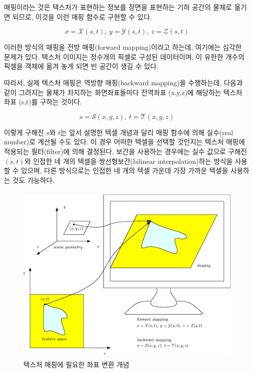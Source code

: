 매핑이라는 것은 텍스처가 표현하는 정보를 장면을 표현하는 기하 공간의 물체로 옮기면 되므로, 이것을 이런 매핑 함수로 구현할 수 있다.

$$x = {\mathcal X}(s,t), ~ y = {\mathcal Y}(s,t), ~ z={\mathcal Z}(s,t)$$


이러한 방식의 매핑을 전방 매핑(forward mapping)이라고 하는데, 여기에는 심각한 문제가 있다. 텍스처 이미지는 정수개의 픽셀로 구성된 데이터이며, 이 유한한 개수의 픽셀을 객체에 옮겨 놓게 되면 빈 공간이 생길 수 있다.

따라서, 실제 텍스처 매핑은 역방향 매핑(backward mapping)을 수행하는데, 다음과 같이 그려지는 물체가 차지하는 화면좌표들마다 전역좌표 (x,y,z)에 해당하는 텍스처 좌표 (s,t)를 구하는 것이다.

$$s = {\mathcal S}(x,y,z), ~ t = {\mathcal T}(x,y,z)$$

이렇게 구해진 $s$와 $t$는 앞서 설명한 텍셀 개념과 달리 매핑 함수에 의해 실수(real number)로 계산될 수도 있다. 
이 경우 어떠한 텍셀을 선택할 것인지는 텍스처 매핑에 적용되는 필터(filter)에 의해 결정된다.
보간을 사용하는 경우에는 실수 값으로 구해진 $(s,t)$와 인접한 네 개의 텍셀을 쌍선형보간(bilinear interpolation)하는 방식을 사용할 수 있으며,
다른 방식으로는 인접한 네 개의 텍셀 가운데 가장 가까운 텍셀을 사용하는 것도 가능하다.

\begin{figure}[h!]
  \centering
	\includegraphics[height=9cm]{OGL_texture/textureMapping.eps}
    \caption{텍스처 매핑에 필요한 좌표 변환 개념}
    \label{fig:OGL_texture:mappingConcept}
\end{figure}

